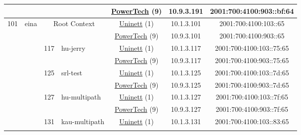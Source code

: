\begin{small}
\begin{center}
\begin{longtable}{|c|c|c|c|c|c|c|c|}
  &  &  &  & \multicolumn{2}{|c|}{\tiny{\href{http://www.powertech.no}{PowerTech} (9)}} & \tiny{10.9.3.191} & \tiny{2001:700:4100:903::bf:64} \\ \hline
 \multirow{26}{*}{\tiny{101}} & \multicolumn{1}{|l|}{\multirow{26}{*}{\tiny{eina}}} & \multicolumn{2}{|c|}{\multirow{2}{*}{\tiny{Root Context}}} & \multicolumn{2}{|c|}{\tiny{\href{https://www.uninett.no}{Uninett} (1)}} & \tiny{10.1.3.101} & \tiny{2001:700:4100:103::65} \\* \cline{5-5}\cline{6-6}\cline{7-7}\cline{8-8}
  &  & \multicolumn{2}{|c|}{} & \multicolumn{2}{|c|}{\tiny{\href{http://www.powertech.no}{PowerTech} (9)}} & \tiny{10.9.3.101} & \tiny{2001:700:4100:903::65} \\* \cline{3-3}\cline{4-4}\cline{5-5}\cline{6-6}\cline{7-7}\cline{8-8}
  &  & \multirow{2}{*}{\tiny{117}} & \multicolumn{1}{|l|}{\multirow{2}{*}{\tiny{hu-jerry}}} & \multicolumn{2}{|c|}{\tiny{\href{https://www.uninett.no}{Uninett} (1)}} & \tiny{10.1.3.117} & \tiny{2001:700:4100:103::75:65} \\* \cline{5-5}\cline{6-6}\cline{7-7}\cline{8-8}
  &  &  &  & \multicolumn{2}{|c|}{\tiny{\href{http://www.powertech.no}{PowerTech} (9)}} & \tiny{10.9.3.117} & \tiny{2001:700:4100:903::75:65} \\* \cline{3-3}\cline{4-4}\cline{5-5}\cline{6-6}\cline{7-7}\cline{8-8}
  &  & \multirow{2}{*}{\tiny{125}} & \multicolumn{1}{|l|}{\multirow{2}{*}{\tiny{srl-test}}} & \multicolumn{2}{|c|}{\tiny{\href{https://www.uninett.no}{Uninett} (1)}} & \tiny{10.1.3.125} & \tiny{2001:700:4100:103::7d:65} \\* \cline{5-5}\cline{6-6}\cline{7-7}\cline{8-8}
  &  &  &  & \multicolumn{2}{|c|}{\tiny{\href{http://www.powertech.no}{PowerTech} (9)}} & \tiny{10.9.3.125} & \tiny{2001:700:4100:903::7d:65} \\* \cline{3-3}\cline{4-4}\cline{5-5}\cline{6-6}\cline{7-7}\cline{8-8}
  &  & \multirow{2}{*}{\tiny{127}} & \multicolumn{1}{|l|}{\multirow{2}{*}{\tiny{hu-multipath}}} & \multicolumn{2}{|c|}{\tiny{\href{https://www.uninett.no}{Uninett} (1)}} & \tiny{10.1.3.127} & \tiny{2001:700:4100:103::7f:65} \\* \cline{5-5}\cline{6-6}\cline{7-7}\cline{8-8}
  &  &  &  & \multicolumn{2}{|c|}{\tiny{\href{http://www.powertech.no}{PowerTech} (9)}} & \tiny{10.9.3.127} & \tiny{2001:700:4100:903::7f:65} \\* \cline{3-3}\cline{4-4}\cline{5-5}\cline{6-6}\cline{7-7}\cline{8-8}
  &  & \multirow{2}{*}{\tiny{131}} & \multicolumn{1}{|l|}{\multirow{2}{*}{\tiny{kau-multipath}}} & \multicolumn{2}{|c|}{\tiny{\href{https://www.uninett.no}{Uninett} (1)}} & \tiny{10.1.3.131} & \tiny{2001:700:4100:103::83:65} \\* \cline{5-5}\cline{6-6}\cline{7-7}\cline{8-8}

\end{longtable}
\end{center}
\end{small}
